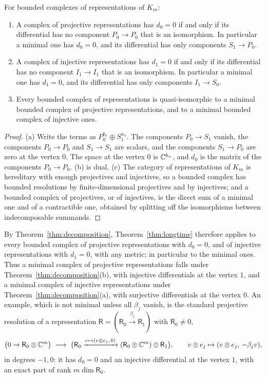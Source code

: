 \begin{proposition}\label{prop:minimal}
For bounded complexes of representations of $K_m$:
\begin{enumerate}
\item[(a)] A complex of projective representations has $d_0=0$ if and only
 if its differential has no component $P_0\to P_0$ that is an isomorphism.
 In particular a minimal one has $d_0=0$, and its differential has only
 components $S_1\to P_0$.
\item[(b)] A complex of injective representations has $d_1=0$ if and only if
 its differential has no component $I_1\to I_1$ that is an isomorphism. In
 particular a minimal one has $d_1=0$, and its differential has only
 components $I_1\to S_0$.
\item[(c)] Every bounded complex of representations is quasi-isomorphic to a
 minimal bounded complex of projective representations, and to a minimal
 bounded complex of injective ones.
\end{enumerate}
\end{proposition}

\begin{proof}
(a) Write the terms as $P_0^{b_n}\oplus S_1^{a_n}$. The components
$P_0\to S_1$ vanish, the components $P_0\to P_0$ and $S_1\to S_1$ are
scalars, and the components $S_1\to P_0$ are zero at the vertex $0$. The
space at the vertex $0$ is $\mathbb C^{b_n}$, and $d_0$ is the matrix of the
components $P_0\to P_0$. (b) is dual. (c) The category of representations of
$K_m$ is hereditary with enough projectives and injectives, so a bounded
complex has bounded resolutions by finite-dimensional projectives and by
injectives; and a bounded complex of projectives, or of injectives, is the
direct sum of a minimal one and of a contractible one, obtained by splitting
off the isomorphisms between indecomposable summands.
\end{proof}

By Theorem~\ref{thm:decomposition}, Theorem~\ref{thm:longtime} therefore
applies to every bounded complex of projective representations with
$d_0=0$, and of injective representations with $d_1=0$, with any metric; in
particular to the minimal ones. Thus a minimal complex of projective
representations falls under Theorem~\ref{thm:decomposition}(b), with
injective differentials at the vertex $1$, and a minimal complex of
injective representations under Theorem~\ref{thm:decomposition}(a), with
surjective differentials at the vertex $0$. An example, which is not minimal unless all
$\beta_j$ vanish, is the standard projective resolution of a representation
$\mathsf R=(\mathsf R_0\xrightarrow{\beta_j}\mathsf R_1)$ with $\mathsf R_0\neq0$,
\[
 \bigl(0\to\mathsf R_0\otimes\CC^m\bigr)\ \longrightarrow\
 \bigl(\mathsf R_0\xrightarrow{v\mapsto(v\otimes e_j,\,0)}(\mathsf R_0\otimes\CC^m)\oplus\mathsf R_1\bigr),
 \qquad v\otimes e_j\mapsto(v\otimes e_j,\,-\beta_jv),
\]
in degrees $-1,0$: it has $d_0=0$ and an injective differential at the
vertex $1$, with an exact part of rank $m\dim\mathsf R_0$.

